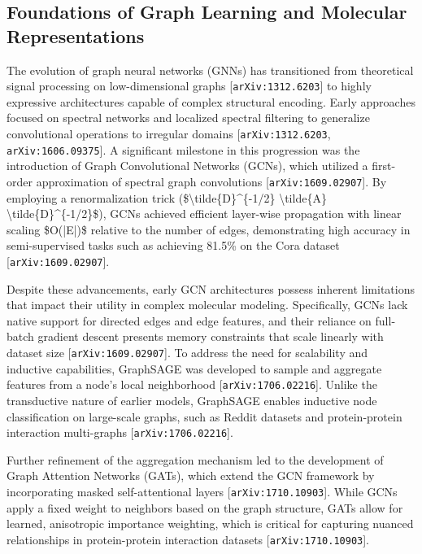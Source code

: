 \documentclass[11pt]{article}
\begin{document}
\subsection{Foundations of Graph Learning and Molecular Representations}

The evolution of graph neural networks (GNNs) has transitioned from theoretical signal processing on low-dimensional graphs [\texttt{arXiv:1312.6203}] to highly expressive architectures capable of complex structural encoding. Early approaches focused on spectral networks and localized spectral filtering to generalize convolutional operations to irregular domains [\texttt{arXiv:1312.6203}, \texttt{arXiv:1606.09375}]. A significant milestone in this progression was the introduction of Graph Convolutional Networks (GCNs), which utilized a first-order approximation of spectral graph convolutions [\texttt{arXiv:1609.02907}]. By employing a renormalization trick (\$\textbackslash{}tilde\{D\}\textasciicircum{}\{-1/2\} \textbackslash{}tilde\{A\} \textbackslash{}tilde\{D\}\textasciicircum{}\{-1/2\}\$), GCNs achieved efficient layer-wise propagation with linear scaling \$O(|E|)\$ relative to the number of edges, demonstrating high accuracy in semi-supervised tasks such as achieving 81.5\% on the Cora dataset [\texttt{arXiv:1609.02907}].

Despite these advancements, early GCN architectures possess inherent limitations that impact their utility in complex molecular modeling. Specifically, GCNs lack native support for directed edges and edge features, and their reliance on full-batch gradient descent presents memory constraints that scale linearly with dataset size [\texttt{arXiv:1609.02907}]. To address the need for scalability and inductive capabilities, GraphSAGE was developed to sample and aggregate features from a node's local neighborhood [\texttt{arXiv:1706.02216}]. Unlike the transductive nature of earlier models, GraphSAGE enables inductive node classification on large-scale graphs, such as Reddit datasets and protein-protein interaction multi-graphs [\texttt{arXiv:1706.02216}].

Further refinement of the aggregation mechanism led to the development of Graph Attention Networks (GATs), which extend the GCN framework by incorporating masked self-attentional layers [\texttt{arXiv:1710.10903}]. While GCNs apply a fixed weight to neighbors based on the graph structure, GATs allow for learned, anisotropic importance weighting, which is critical for capturing nuanced relationships in protein-protein interaction datasets [\texttt{arXiv:1710.10903}].
\end{document}
